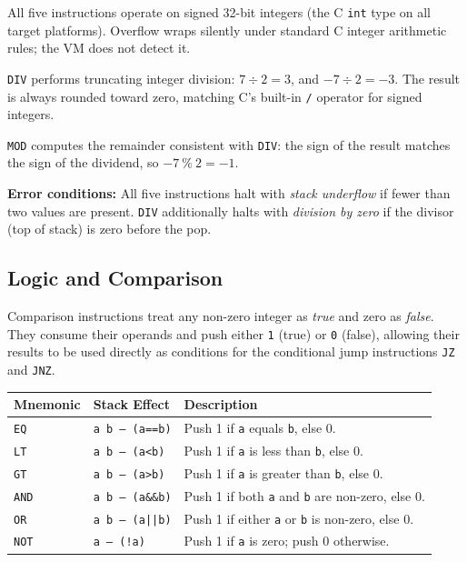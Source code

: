All five instructions operate on signed 32-bit integers (the C \texttt{int} type on all target platforms). Overflow wraps silently under standard C integer arithmetic rules; the VM does not detect it.

\texttt{DIV} performs truncating integer division: $7 \div 2 = 3$, and $-7 \div 2 = -3$. The result is always rounded toward zero, matching C's built-in \texttt{/} operator for signed integers.

\texttt{MOD} computes the remainder consistent with \texttt{DIV}: the sign of the result matches the sign of the dividend, so $-7~\%~2 = -1$.

\textbf{Error conditions:} All five instructions halt with \textit{stack underflow} if fewer than two values are present. \texttt{DIV} additionally halts with \textit{division by zero} if the divisor (top of stack) is zero before the pop.

\subsection{Logic and Comparison}

Comparison instructions treat any non-zero integer as \textit{true} and zero as \textit{false}. They consume their operands and push either \texttt{1} (true) or \texttt{0} (false), allowing their results to be used directly as conditions for the conditional jump instructions \texttt{JZ} and \texttt{JNZ}.

\begin{center}
\begin{tabular}{lll}
\toprule
\textbf{Mnemonic} & \textbf{Stack Effect}        & \textbf{Description} \\
\midrule
\texttt{EQ}  & \texttt{a b -- (a==b)} & Push 1 if \texttt{a} equals \texttt{b}, else 0. \\
\texttt{LT}  & \texttt{a b -- (a<b)}  & Push 1 if \texttt{a} is less than \texttt{b}, else 0. \\
\texttt{GT}  & \texttt{a b -- (a>b)}  & Push 1 if \texttt{a} is greater than \texttt{b}, else 0. \\
\texttt{AND} & \texttt{a b -- (a\&\&b)} & Push 1 if both \texttt{a} and \texttt{b} are non-zero, else 0. \\
\texttt{OR}  & \texttt{a b -- (a||b)} & Push 1 if either \texttt{a} or \texttt{b} is non-zero, else 0. \\
\texttt{NOT} & \texttt{a -- (!a)}     & Push 1 if \texttt{a} is zero; push 0 otherwise. \\
\bottomrule
\end{tabular}
\end{center}

